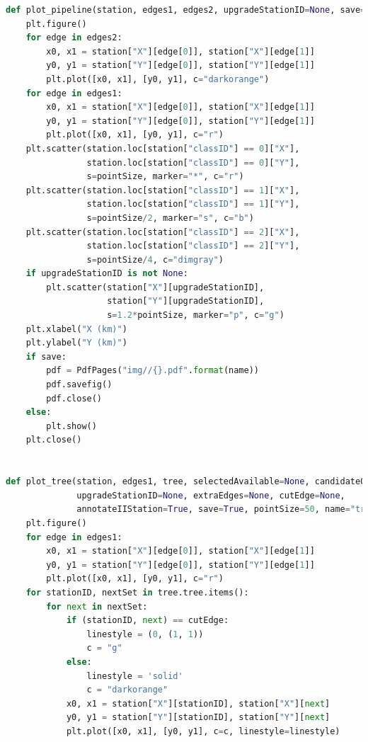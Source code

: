\documentclass{cumcmthesis}
\begin{document}
\begin{appendices}
\begin{lstlisting}[language=python]
def plot_pipeline(station, edges1, edges2, upgradeStationID=None, save=True, pointSize=50, name="pipeline"):
    plt.figure()
    for edge in edges2:
        x0, x1 = station["X"][edge[0]], station["X"][edge[1]]
        y0, y1 = station["Y"][edge[0]], station["Y"][edge[1]]
        plt.plot([x0, x1], [y0, y1], c="darkorange")
    for edge in edges1:
        x0, x1 = station["X"][edge[0]], station["X"][edge[1]]
        y0, y1 = station["Y"][edge[0]], station["Y"][edge[1]]
        plt.plot([x0, x1], [y0, y1], c="r")
    plt.scatter(station.loc[station["classID"] == 0]["X"],
                station.loc[station["classID"] == 0]["Y"],
                s=pointSize, marker="*", c="r")
    plt.scatter(station.loc[station["classID"] == 1]["X"],
                station.loc[station["classID"] == 1]["Y"],
                s=pointSize/2, marker="s", c="b")
    plt.scatter(station.loc[station["classID"] == 2]["X"],
                station.loc[station["classID"] == 2]["Y"],
                s=pointSize/4, c="dimgray")
    if upgradeStationID is not None:
        plt.scatter(station["X"][upgradeStationID],
                    station["Y"][upgradeStationID],
                    s=1.2*pointSize, marker="p", c="g")
    plt.xlabel("X (km)")
    plt.ylabel("Y (km)")
    if save:
        pdf = PdfPages("img//{}.pdf".format(name))
        pdf.savefig()
        pdf.close()
    else:
        plt.show()
    plt.close()


def plot_tree(station, edges1, tree, selectedAvailable=None, candidateOverload=None,
              upgradeStationID=None, extraEdges=None, cutEdge=None,
              annotateIIStation=True, save=True, pointSize=50, name="tree"):
    plt.figure()
    for edge in edges1:
        x0, x1 = station["X"][edge[0]], station["X"][edge[1]]
        y0, y1 = station["Y"][edge[0]], station["Y"][edge[1]]
        plt.plot([x0, x1], [y0, y1], c="r")
    for stationID, nextSet in tree.tree.items():
        for next in nextSet:
            if (stationID, next) == cutEdge:
                linestyle = (0, (1, 1))
                c = "g"
            else:
                linestyle = 'solid'
                c = "darkorange"
            x0, x1 = station["X"][stationID], station["X"][next]
            y0, y1 = station["Y"][stationID], station["Y"][next]
            plt.plot([x0, x1], [y0, y1], c=c, linestyle=linestyle)


\end{lstlisting}
\end{appendices}
\end{document}
